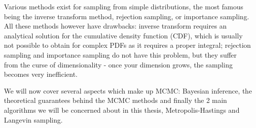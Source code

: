\documentclass[12pt]{memoir}
\begin{document}
Various methods exist for sampling from simple distributions, the most famous being the inverse transform method, rejection sampling, or importance sampling. All these methods however have drawbacks: inverse transform requires an analytical solution for the cumulative density function (CDF), which is usually not possible to obtain for complex PDFs as it requires a proper integral; rejection sampling and importance sampling do not have this problem, but they suffer from the curse of dimensionality - once your dimension grows, the sampling becomes very inefficient.\medbreak

We will now cover several aspects which make up MCMC: Bayesian inference, the theoretical guarantees behind the MCMC methods and finally the 2 main algorithms we will be concerned about in this thesis, Metropolis-Hastings and Langevin sampling.
\end{document}

